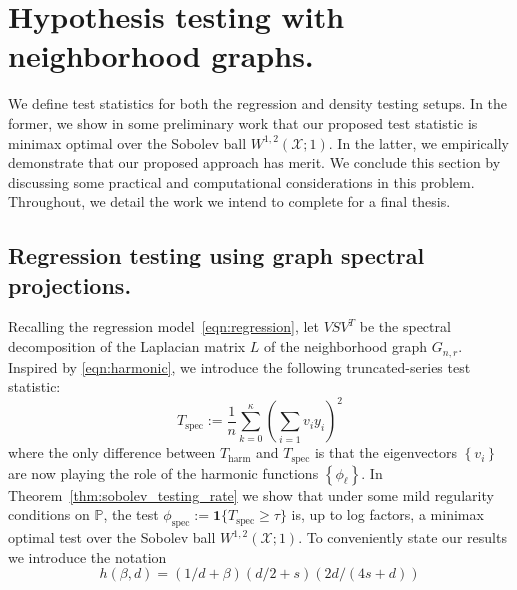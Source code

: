 \documentclass{article}
\newcommand{\set}[1]{\left\{#1\right\}}
\newcommand{\1}{\mathbf{1}}
\newcommand{\Pbb}{\mathbb{P}}
\theoremstyle{alden}
\theoremstyle{aldenthm}
\theoremstyle{definition}
\theoremstyle{remark}
\begin{document}
\section{Hypothesis testing with neighborhood graphs.}

We define test statistics for both the regression and density testing setups. In the former, we show in some preliminary work that our proposed test statistic is minimax optimal over the Sobolev ball $W^{1,2}(\mathcal{X};1)$. In the latter, we empirically demonstrate that our proposed approach has merit. We conclude this section by discussing some practical and computational considerations in this problem. Throughout, we detail the work we intend to complete for a final thesis.

\subsection{Regression testing using graph spectral projections.}
\label{subsec:spectral_regression_testing}

Recalling the regression model~\eqref{eqn:regression}, let $VSV^T$ be the spectral decomposition of the Laplacian matrix $L$ of the neighborhood graph $G_{n,r}$. Inspired by \eqref{eqn:harmonic}, we introduce the following truncated-series test statistic:
\begin{equation}
\label{eqn:graph_spectral_projections}
T_{\mathrm{spec}} := \frac{1}{n} \sum_{k = 0}^{\kappa} \left(\sum_{i = 1} v_i y_i\right)^2
\end{equation}
where the only difference between $T_{\mathrm{harm}}$ and $T_{\mathrm{spec}}$ is that the eigenvectors $\set{v_i}$ are now playing the role of the harmonic functions $\set{\phi_{\ell}}$. In Theorem~\ref{thm:sobolev_testing_rate} we show that under some mild regularity conditions on $\Pbb$, the test $\phi_{\textrm{spec}} := \1\{T_{\mathrm{spec}} \geq \tau\}$ is, up to log factors, a minimax optimal test over the Sobolev ball $W^{1,2}(\mathcal{X};1)$. To conveniently state our results we introduce the notation
\begin{equation*}
h(\beta,d) = (1/d + \beta)(d/2 + s)(2d/(4s + d))
\end{equation*}
\end{document}
